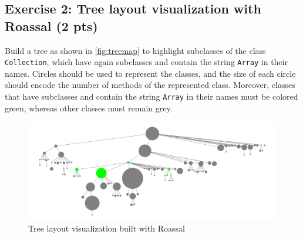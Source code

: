 \documentclass [11pt, a4wide, twoside]{article}
\begin{document}
\newpage

\subsection*{Exercise 2: Tree layout visualization with Roassal  (2 pts)}
Build a tree as shown in \autoref{fig:treemap} to highlight subclasses of the class \texttt{Collection}, which have again subclasses and contain the string \texttt{Array} in their names. Circles should be used to represent the classes, and the size of each circle should encode the number of methods of the represented class. Moreover, classes that have subclasses and contain the string \texttt{Array} in their names must be colored green, whereas other classes must remain grey.

\begin{figure}[H]
\centering
\includegraphics[scale=0.5]{images/2.png}
\caption{Tree layout visualization built with Roassal}
\label{fig:treemap}
\end{figure}

\end{document}
